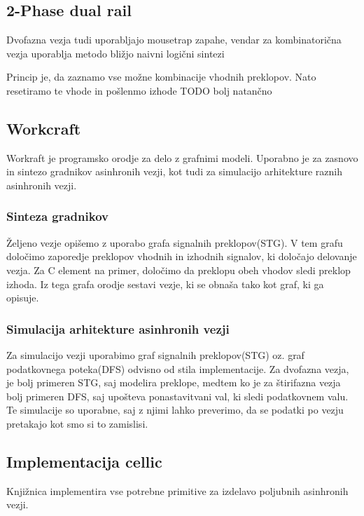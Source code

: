 \subsection{2-Phase dual rail} \label{b}
Dvofazna vezja tudi uporabljajo mousetrap zapahe, vendar za kombinatorična vezja uporablja metodo bližjo naivni logični sintezi

Princip je, da zaznamo vse možne kombinacije vhodnih preklopov. Nato resetiramo te vhode in pošlenmo izhode TODO bolj natančno



\subsection{Workcraft} \label{b}
Workraft je programsko orodje za delo z grafnimi modeli. Uporabno je za zasnovo in sintezo gradnikov asinhronih vezji, kot tudi za simulacijo arhitekture raznih asinhronih vezji.

\subsubsection{Sinteza gradnikov} \label{b}
Željeno vezje opišemo z uporabo grafa signalnih preklopov(STG). V tem grafu določimo zaporedje preklopov vhodnih in izhodnih signalov, ki določajo delovanje vezja. Za C element na primer, določimo da preklopu obeh vhodov sledi preklop izhoda. Iz tega grafa orodje sestavi vezje, ki se obnaša tako kot graf, ki ga opisuje.

\subsubsection{Simulacija arhitekture asinhronih vezji} \label{b}
Za simulacijo vezji uporabimo graf signalnih preklopov(STG) oz. graf podatkovnega poteka(DFS) odvisno od stila implementacije. Za dvofazna vezja, je bolj primeren STG, saj modelira preklope, medtem ko je za štirifazna vezja bolj primeren DFS, saj upošteva ponastavitvani val, ki sledi podatkovnem valu. Te simulacije so uporabne, saj z njimi lahko preverimo, da se podatki po vezju pretakajo kot smo si to zamislisi.




\subsection{Implementacija cellic} \label{a}
Knjižnica implementira vse potrebne primitive za izdelavo poljubnih asinhronih vezji.


